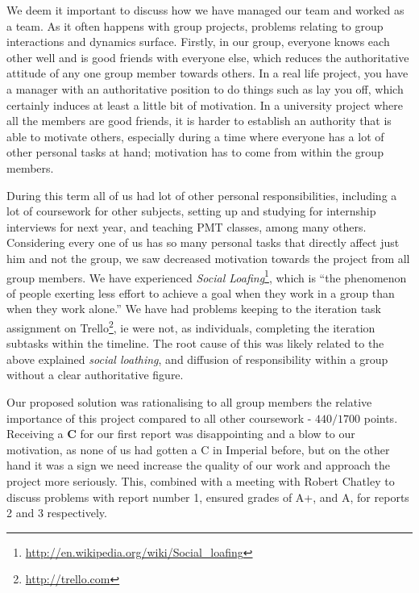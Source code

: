 \documentclass{report}
\begin{document}
		We deem it important to discuss how we have managed our team and worked as a team. As it often happens with group projects, problems relating to group interactions and dynamics surface. Firstly, in our group, everyone knows each other well and is good friends with everyone else, which reduces the authoritative attitude of any one group member towards others. In a real life project, you have a manager with an authoritative position to do things such as lay you off, which certainly induces at least a little bit of motivation. In a university project where all the members are good friends, it is harder to establish an authority that is able to motivate others, especially during a time where everyone has a lot of other personal tasks at hand; motivation has to come from within the group members.

		During this term all of us had lot of other personal responsibilities, including a lot of coursework for other subjects, setting up and studying for internship interviews for next year, and teaching PMT classes, among many others. Considering every one of us has so many personal tasks that directly affect just him and not the group, we saw decreased motivation towards the project from all group members. We have experienced \emph{Social Loafing}\footnote{\url{http://en.wikipedia.org/wiki/Social_loafing}}, which is ``the phenomenon of people exerting less effort to achieve a goal when they work in a group than when they work alone.'' We have had problems keeping to the iteration task assignment on Trello\footnote{\url{http://trello.com}}, ie were not, as individuals, completing the iteration subtasks within the timeline. The root cause of this was likely related to the above explained \emph{social loathing}, and diffusion of responsibility within a group without a clear authoritative figure.

		Our proposed solution was rationalising to all group members the relative importance of this project compared to all other coursework - $440/1700$ points. Receiving a \textbf{C} for our first report was disappointing and a blow to our motivation, as none of us had gotten a C in Imperial before, but on the other hand it was a sign we need increase the quality of our work and approach the project more seriously. This, combined with a meeting with Robert Chatley to discuss problems with report number 1, ensured grades of A+, and A, for reports 2 and 3 respectively. 
		
\end{document}
